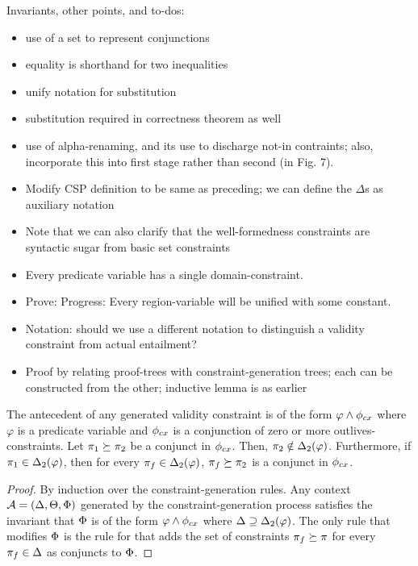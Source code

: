 Invariants, other points, and to-dos:
\begin{itemize}
  \item use of a set to represent conjunctions
  \item equality is shorthand for two inequalities
  \item unify notation for substitution
  \item substitution required in correctness theorem as well
  \item use of alpha-renaming, and its use to discharge not-in contraints;
also, incorporate this into first stage rather than second (in Fig. 7).
  \item Modify CSP definition to be same as preceding; we can define the $\Delta$s 
    as auxiliary notation
  \item Note that we can also clarify that the well-formedness constraints are
    syntactic sugar from basic set constraints
  \item Every predicate variable has a single domain-constraint.
  \item Prove: Progress: Every region-variable will be unified with some constant.
  \item Notation: should we use a different notation to distinguish a validity constraint
    from actual entailment?
  \item Proof by relating proof-trees with constraint-generation trees; each can
    be constructed from the other; inductive lemma is as earlier
\end{itemize}

\begin{lemma}
The antecedent of any generated validity constraint is of the form
$\varphi \wedge \phi_{cx}$ where $\varphi$ is a predicate variable and
$\phi_{cx}$ is a conjunction of zero or more outlives-constraints.
Let $\pi_1 \succeq \pi_2$ be a conjunct in $\phi_{cx}$.
Then, $\pi_2 \notin {\Delta_2}(\varphi)$.
Furthermore, if $\pi_1 \in {\Delta_2}(\varphi)$, then for
every $\pi_f \in {\Delta_2}(\varphi)$, $\pi_f \succeq \pi_2$ is
a conjunct in $\phi_{cx}$.
\end{lemma}

\begin{proof}
  By induction over the constraint-generation rules.
  Any context ${\mathcal{A}} = (\Delta,\Theta,\Phi)$ generated by the constraint-generation
  process satisfies the invariant that $\Phi$ is of the form $\varphi \wedge \phi_{cx}$
  where $\Delta \supseteq {\Delta_2}(\varphi)$.
  The only rule that modifies $\Phi$ is the rule for 
  that adds the set of constraints $\pi_f \succeq \pi$ for every $\pi_f \in \Delta$
  as conjuncts to $\Phi$.
\end{proof}


